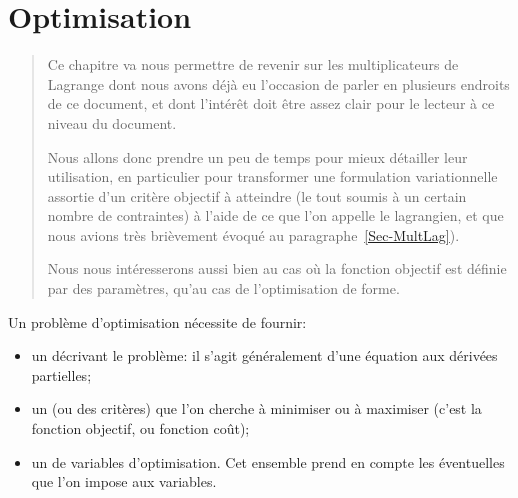\chapter{Optimisation}\label{Ch-Optim}
\begin{abstract}
Ce chapitre va nous permettre de revenir sur les multiplicateurs de Lagrange dont nous avons déjà eu l'occasion de parler en plusieurs endroits de ce document, et dont l'intérêt doit être assez clair pour le lecteur à ce niveau du document.

Nous allons donc prendre un peu de temps pour mieux détailler leur utilisation, en particulier pour transformer une formulation variationnelle assortie d'un critère objectif à atteindre (le tout soumis à un certain nombre de contraintes) à l'aide de ce que l'on appelle le lagrangien, et que nous avions très brièvement évoqué au paragraphe~\ref{Sec-MultLag}).

Nous nous intéresserons aussi bien au cas où la fonction objectif est définie par des paramètres, qu'au cas de l'optimisation de forme.
\end{abstract}

\medskip
Un problème d'optimisation nécessite de fournir:
\begin{itemize}
   \item un  décrivant le problème: il s'agit généralement d'une équation aux dérivées partielles;
   \item un  (ou des critères) que l'on cherche à minimiser ou à maximiser (c'est la fonction objectif, ou fonction coût);
   \item un  de variables d'optimisation. Cet ensemble prend en compte les éventuelles  que l'on impose aux variables.
\end{itemize}

